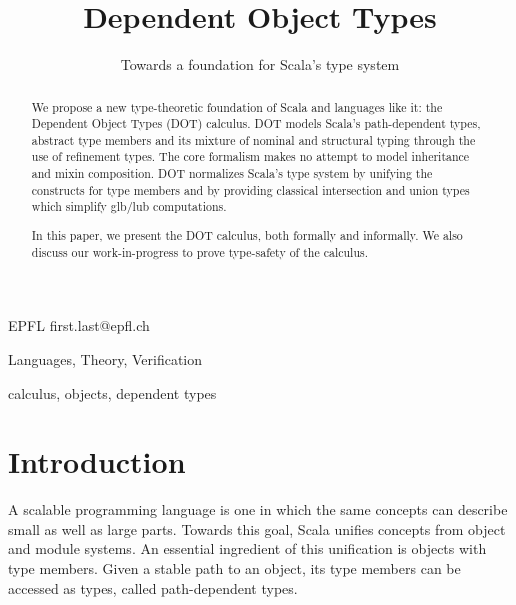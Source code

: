 \documentclass[9pt]{sigplanconf}
\begin{document}
\copyrightdata{[to be supplied]} 

\title{Dependent Object Types}
\subtitle{Towards a foundation for Scala's type system}

           {EPFL}
           {first.last@epfl.ch}

\maketitle

\begin{abstract}
We propose a new type-theoretic foundation of Scala and languages like
it: the Dependent Object Types (DOT) calculus. DOT models Scala's
path-dependent types, abstract type members and its mixture of nominal
and structural typing through the use of refinement types. The core
formalism makes no attempt to model inheritance and mixin
composition. DOT normalizes Scala's type system by unifying the
constructs for type members and by providing classical intersection
and union types which simplify glb/lub computations.

In this paper, we present the DOT calculus, both formally and
informally. We also discuss our work-in-progress to prove type-safety
of the calculus.
\end{abstract}


\terms
Languages, Theory, Verification

\keywords
calculus, objects, dependent types%

\section{Introduction}
A scalable programming language is one in which the same concepts can
describe small as well as large parts. Towards this goal, Scala
unifies concepts from object and module systems. An essential
ingredient of this unification is objects with type members. Given a
stable path to an object, its type members can be accessed as types,
called path-dependent types.
\end{document}
